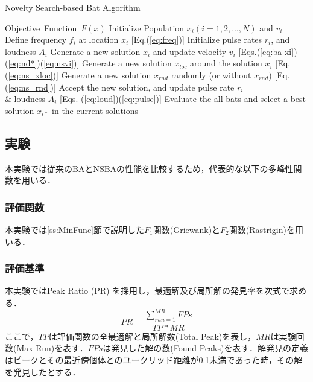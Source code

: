 \documentclass[a4j,11pt]{jarticle}
\begin{document}
\begin{algorithm}[H]
\caption{Novelty Search-based Bat Algorithm}
\label{code:nsba}
\begin{algorithmic}[6]
\REQUIRE Objective\ Function\ $F(x)$
\STATE Initialize Population $x_i(i=1,2,..., N)$ and $v_i$\\
\STATE Define frequency $f_i$ at location $x_i$ [Eq.(\ref{eq:freq})]
\STATE Initialize pulse rates $r_i$, and loudness $A_i$
\STATE Generate a new solution $x_i$ and update velocity $v_i$  [Eqs.(\ref{eq:ba-xi})(\ref{eq:nd*})(\ref{eq:nsvi})] 
\STATE Generate a new solution ${x_{loc}}$ around the solution $x_{i}$ [Eq.(\ref{eq:ns_xloc})] 
\ENDIF
\STATE Generate a new solution $x_{rnd}$ randomly (or without ${x_{rnd}}$) [Eq. (\ref{eq:ns_rnd})]
\STATE Accept the new solution, and update pulse rate $r_i$ \\ \& loudness $A_i$ [Eqs. (\ref{eq:loud})(\ref{eq:pulse})] 
\ENDIF
\ENDFOR
\STATE Evaluate the all bats and select a best solution $x_{i*}$ in the current solutions
\ENDWHILE
\end{algorithmic}
\end{algorithm}

\subsection{実験}
\label{ss:NSBA-exp}
本実験では従来のBAとNSBAの性能を比較するため，代表的な以下の多峰性関数を用いる．

\subsubsection{評価関数}
\label{sss:NSBA-func}
本実験では\ref{ss:MinFunc}節で説明した$F_1$関数(Griewank)と$F_2$関数(Rastrigin)を用いる．


\FloatBarrier

\subsubsection{評価基準}
\label{sss:NSBA-eval}
本実験ではPeak Ratio (PR) \cite{CDE} を採用し，最適解及び局所解の発見率を次式で求める．
\begin{equation}
\label{eq:PR}
PR=\frac{\sum_{run=1}^{MR}FPs}{TP*MR}
\end{equation}
ここで，$TP$は評価関数の全最適解と局所解数(Total Peak)を表し，$MR$は実験回数(Max Run)を表す．$FPs$は発見した解の数(Found Peaks)を表す．解発見の定義はピークとその最近傍個体とのユークリッド距離が0.1未満であった時，その解を発見したとする．
\end{document}

